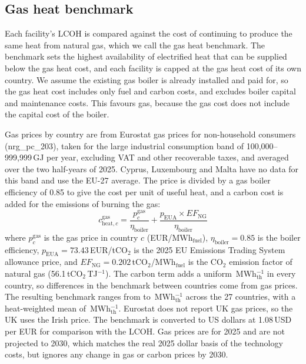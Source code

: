 \documentclass[11pt]{article}
\begin{document}
\subsection*{Gas heat benchmark}
Each facility's LCOH is compared against the cost of continuing to produce the same heat from natural gas, which we call the gas heat benchmark. The benchmark sets the highest availability of electrified heat that can be supplied below the gas heat cost, and each facility is capped at the gas heat cost of its own country. We assume the existing gas boiler is already installed and paid for, so the gas heat cost includes only fuel and carbon costs, and excludes boiler capital and maintenance costs. This favours gas, because the gas cost does not include the capital cost of the boiler.

Gas prices by country are from Eurostat gas prices for non-household consumers (nrg\_pc\_203)\cite{eurostat_gasprices}, taken for the large industrial consumption band of 100,000--999,999\,GJ per year, excluding VAT and other recoverable taxes, and averaged over the two half-years of 2025. Cyprus, Luxembourg and Malta have no data for this band and use the EU-27 average. The price is divided by a gas boiler efficiency of 0.85\cite{energynl_boiler} to give the cost per unit of useful heat, and a carbon cost is added for the emissions of burning the gas:
\begin{equation}
c^{\mathrm{gas}}_{\mathrm{heat},c} = \frac{p^{\mathrm{gas}}_{c}}{\eta_{\mathrm{boiler}}} + \frac{p_{\mathrm{EUA}} \times EF_{\mathrm{NG}}}{\eta_{\mathrm{boiler}}}
\label{eq:gas}
\end{equation}
where $p^{\mathrm{gas}}_{c}$ is the gas price in country $c$ (EUR/MWh$_{\mathrm{fuel}}$), $\eta_{\mathrm{boiler}} = 0.85$ is the boiler efficiency, $p_{\mathrm{EUA}} = 73.43$\,EUR/tCO$_2$ is the 2025 EU Emissions Trading System allowance price\cite{icap_euets}, and $EF_{\mathrm{NG}} = 0.202$\,tCO$_2$/MWh$_{\mathrm{fuel}}$ is the CO$_2$ emission factor of natural gas (56.1\,tCO$_2$\,TJ$^{-1}$\cite{ipcc2006stationary}). The carbon term adds a uniform \,MWh$_{\mathrm{th}}^{-1}$ in every country, so differences in the benchmark between countries come from gas prices. The resulting benchmark ranges from  to \,MWh$_{\mathrm{th}}^{-1}$ across the 27 countries, with a heat-weighted mean of \,MWh$_{\mathrm{th}}^{-1}$. Eurostat does not report UK gas prices, so the UK uses the Irish price. The benchmark is converted to US dollars at 1.08\,USD per EUR for comparison with the LCOH. Gas prices are for 2025 and are not projected to 2030, which matches the real 2025 dollar basis of the technology costs, but ignores any change in gas or carbon prices by 2030.
\end{document}
